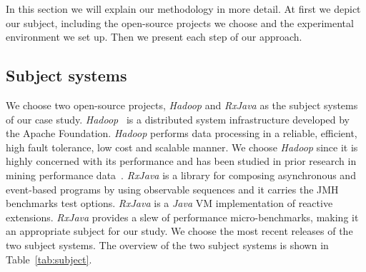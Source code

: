 In this section we will explain our methodology in more detail. At first we depict our subject, including the open-source projects we choose and the experimental environment we set up. Then we present each step of our approach.

\subsection{Subject systems}

We choose two open-source projects, \emph{Hadoop} and \emph{RxJava} as the subject systems of our case study. \emph{Hadoop}~\cite{hadoop2012:White} is a distributed system infrastructure developed by the Apache Foundation. \emph{Hadoop} performs data processing in a reliable, efficient, high fault tolerance, low cost and scalable manner. We choose \emph{Hadoop} since it is highly concerned with its performance and has been studied in prior research in mining performance data~\cite{markASE}. \emph{RxJava} is a library for composing asynchronous and event-based programs by using observable sequences and it carries the JMH benchmarks test options. \emph{RxJava} is a \emph{Java} VM implementation of reactive extensions. \emph{RxJava} provides a slew of performance micro-benchmarks, making it an appropriate subject for our study. We choose the most recent releases of the two subject systems. The overview of the two subject systems is shown in Table~\ref{tab:subject}. 

